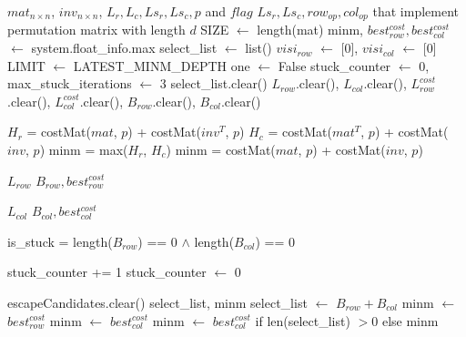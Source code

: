 \begin{algorithm}
\caption{Parallel Greedy}
\footnotesize
\begin{algorithmic}[1]
\Require $mat_{n \times n}$, $inv_{n \times n}$, $L_{r}, L_{c}, Ls_{r}, Ls_{c}, p$ and $flag$
\Ensure $Ls_{r}, Ls_{c}, row_{op}, col_{op}$ that implement permutation matrix with length $d$
\State SIZE $\leftarrow$ length(mat)
\State minm, $best_{row}^{cost}, best_{col}^{cost}$ $\leftarrow$ system.float\_info.max
\State select\_list $\leftarrow$ list()
\State $visi_{row}$ $\leftarrow$ [0], $visi_{col}$ $\leftarrow$ [0]
\State LIMIT $\leftarrow$ LATEST\_MINM\_DEPTH
\State one $\leftarrow$ False
\State stuck\_counter $\leftarrow$ 0, max\_stuck\_iterations $\leftarrow$ 3
	\State select\_list.clear()
	\State $L_{row}$.clear(), $L_{col}$.clear(), $L_{row}^{cost}$.clear(), $L_{col}^{cost}$.clear(), $B_{row}$.clear(), $B_{col}$.clear()
	
		\State $H_r$ = costMat($mat$, $p$) + costMat($inv^{T}$, $p$)
		\State $H_c$ = costMat($mat^{T}$, $p$) + costMat($inv$, $p$)
		\State minm = max($H_r$, $H_c$)
	\Else
		\State minm = costMat($mat$, $p$) + costMat($inv$, $p$)
    \EndIf
    
	    	\State \Return $L_{row}$
		\EndFunction
	    	\State \Return $B_{row}, best_{row}^{cost}$
		\EndFunction
    \EndIf
    
    	\State \Return $L_{col}$
	\EndFunction
		\State \Return $B_{col}, best_{col}^{cost}$
	\EndFunction
	
	\State is\_stuck = length($B_{row}$) == 0 $\land$ length($B_{col}$) == 0
	
		\State stuck\_counter += 1
	\Else
		\State stuck\_counter $\leftarrow$ 0
    \EndIf
    
	    \State escapeCandidates.clear()
	    	\State \Return select\_list, minm
		\EndFunction
	\Else
		\State select\_list $\leftarrow$ $B_{row} + B_{col}$
			\State minm $\leftarrow$ $best_{row}^{cost}$
			\State minm $\leftarrow$ $best_{col}^{cost}$
		\Else
			\State minm $\leftarrow$ $best_{col}^{cost}$ if len(select\_list) $> 0$ else minm
    	\EndIf
	\EndIf
    

\end{algorithmic}
\end{algorithm}
